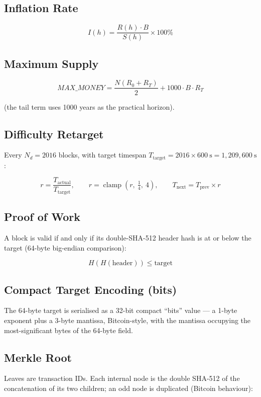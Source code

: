 \documentclass[11pt,a4paper]{article}
\begin{document}
\subsection{Inflation Rate}

\[
I(h) = \frac{R(h) \cdot B}{S(h)} \times 100\%
\]

\subsection{Maximum Supply}

\[
\mathit{MAX\_MONEY} = \frac{N (R_0 + R_T)}{2} + 1000 \cdot B \cdot R_T
\]

(the tail term uses 1000 years as the practical horizon).

\subsection{Difficulty Retarget}

Every $N_d = 2016$ blocks, with target timespan $T_{\text{target}} = 2016 \times 600\ \text{s} = 1{,}209{,}600\ \text{s}$:

\[
r = \frac{T_{\text{actual}}}{T_{\text{target}}}, \qquad
r = \operatorname{clamp}\!\left(r,\ \tfrac{1}{4},\ 4\right), \qquad
T_{\text{next}} = T_{\text{prev}} \times r
\]

\subsection{Proof of Work}

A block is valid if and only if its double-SHA-512 header hash is at or below the target (64-byte big-endian comparison):

\[
H(H(\text{header})) \le \text{target}
\]

\subsection{Compact Target Encoding (bits)}

The 64-byte target is serialised as a 32-bit compact ``bits'' value --- a 1-byte exponent plus a 3-byte mantissa, Bitcoin-style, with the mantissa occupying the most-significant bytes of the 64-byte field.

\subsection{Merkle Root}

Leaves are transaction IDs. Each internal node is the double SHA-512 of the concatenation of its two children; an odd node is duplicated (Bitcoin behaviour):
\end{document}
